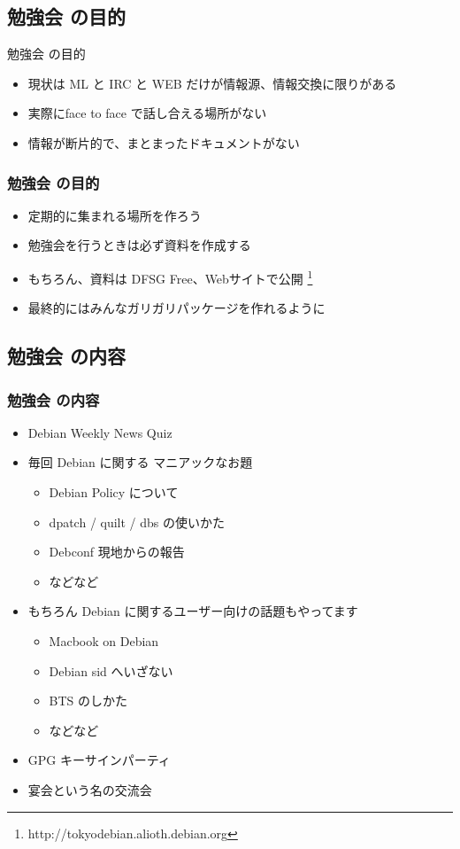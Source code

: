 \documentclass[cjk,dvipdfmx]{beamer}
\begin{document}
\subsection{勉強会 の目的}

\begin{frame}{勉強会 の目的}
\begin{itemize}
  \item<1-> 現状は ML と IRC と WEB だけが情報源、情報交換に限りがある
  \item<2-> 実際にface to face で話し合える場所がない
  \item<3-> 情報が断片的で、まとまったドキュメントがない
\end{itemize}
\end{frame}

\begin{frame}
 \frametitle{勉強会 の目的}
\begin{itemize}
  \item<1-> 定期的に集まれる場所を作ろう
  \item<2-> 勉強会を行うときは必ず資料を作成する
  \item<3-> もちろん、資料は DFSG Free、Webサイトで公開 
\footnote{http://tokyodebian.alioth.debian.org}
  \item<4-> 最終的にはみんなガリガリパッケージを作れるように
\end{itemize}
\end{frame}

\subsection{勉強会 の内容}
\begin{frame}
 \frametitle{勉強会 の内容}
\begin{itemize}
  \item<1-> Debian Weekly News Quiz
  \item<2-> 毎回 Debian に関する マニアックなお題
    \begin{itemize}
	\item Debian Policy について
	\item dpatch / quilt / dbs の使いかた
	\item Debconf 現地からの報告
	\item などなど
    \end{itemize}
  \item<3-> もちろん Debian に関するユーザー向けの話題もやってます
    \begin{itemize}
	\item Macbook on Debian
	\item Debian sid へいざない
	\item BTS のしかた
	\item などなど
    \end{itemize}
  \item<4-> GPG キーサインパーティ
  \item<5-> 宴会という名の交流会
\end{itemize}
\end{frame}
\end{document}
